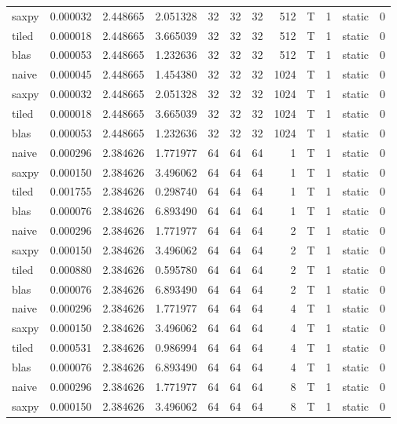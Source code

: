 \documentclass[
  12pt,
  xcolor = usenames,dvipsnames]{article}
\begin{document}
\begin{table}[!h]
{\begin{tabular}[t]{lrrrrrrrlrlr}
saxpy & 0.000032 & 2.448665 & 2.051328 & 32 & 32 & 32 & 512 & T & 1 & static & 0\\
tiled & 0.000018 & 2.448665 & 3.665039 & 32 & 32 & 32 & 512 & T & 1 & static & 0\\
\addlinespace
blas & 0.000053 & 2.448665 & 1.232636 & 32 & 32 & 32 & 512 & T & 1 & static & 0\\
naive & 0.000045 & 2.448665 & 1.454380 & 32 & 32 & 32 & 1024 & T & 1 & static & 0\\
saxpy & 0.000032 & 2.448665 & 2.051328 & 32 & 32 & 32 & 1024 & T & 1 & static & 0\\
tiled & 0.000018 & 2.448665 & 3.665039 & 32 & 32 & 32 & 1024 & T & 1 & static & 0\\
blas & 0.000053 & 2.448665 & 1.232636 & 32 & 32 & 32 & 1024 & T & 1 & static & 0\\
\addlinespace
naive & 0.000296 & 2.384626 & 1.771977 & 64 & 64 & 64 & 1 & T & 1 & static & 0\\
saxpy & 0.000150 & 2.384626 & 3.496062 & 64 & 64 & 64 & 1 & T & 1 & static & 0\\
tiled & 0.001755 & 2.384626 & 0.298740 & 64 & 64 & 64 & 1 & T & 1 & static & 0\\
blas & 0.000076 & 2.384626 & 6.893490 & 64 & 64 & 64 & 1 & T & 1 & static & 0\\
naive & 0.000296 & 2.384626 & 1.771977 & 64 & 64 & 64 & 2 & T & 1 & static & 0\\
\addlinespace
saxpy & 0.000150 & 2.384626 & 3.496062 & 64 & 64 & 64 & 2 & T & 1 & static & 0\\
tiled & 0.000880 & 2.384626 & 0.595780 & 64 & 64 & 64 & 2 & T & 1 & static & 0\\
blas & 0.000076 & 2.384626 & 6.893490 & 64 & 64 & 64 & 2 & T & 1 & static & 0\\
naive & 0.000296 & 2.384626 & 1.771977 & 64 & 64 & 64 & 4 & T & 1 & static & 0\\
saxpy & 0.000150 & 2.384626 & 3.496062 & 64 & 64 & 64 & 4 & T & 1 & static & 0\\
\addlinespace
tiled & 0.000531 & 2.384626 & 0.986994 & 64 & 64 & 64 & 4 & T & 1 & static & 0\\
blas & 0.000076 & 2.384626 & 6.893490 & 64 & 64 & 64 & 4 & T & 1 & static & 0\\
naive & 0.000296 & 2.384626 & 1.771977 & 64 & 64 & 64 & 8 & T & 1 & static & 0\\
saxpy & 0.000150 & 2.384626 & 3.496062 & 64 & 64 & 64 & 8 & T & 1 & static & 0\\

\end{tabular}}
\end{table}
\end{document}
